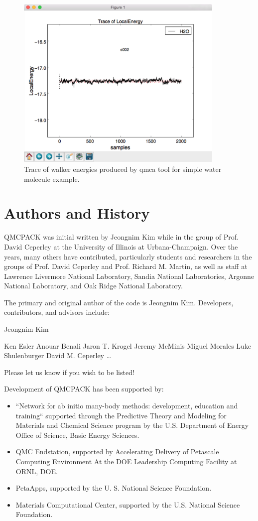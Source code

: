 \begin{figure}
  \centering
  \includegraphics[width=10cm]{figures/quick_qmca_dmc_trace.png}
  \caption{Trace of walker energies produced by qmca tool for simple
    water molecule example.}
  \label{fig:quick_qmca_dmc_trace}
\end{figure}

\section{Authors and History}
\label{sec:history}
QMCPACK was initial written by Jeongnim Kim while in the group of
Prof. David Ceperley at the University of Illinois at
Urbana-Champaign. Over the years, many others have contributed, particularly
students and researchers in the groups of Prof. David Ceperley
and Prof. Richard M. Martin, as well as staff at Lawrence Livermore
National Laboratory, Sandia National Laboratories, Argonne National
Laboratory, and Oak Ridge National Laboratory.

The primary and original author of the code is Jeongnim
Kim. Developers, contributors, and advisors include:

Jeongnim Kim

Ken Esler
Anouar Benali
Jaron T. Krogel
Jeremy McMinis
Miguel Morales
Luke Shulenburger
David M. Ceperley
\ldots

Please let us know if you wish to be listed!

Development of QMCPACK has been supported by:
\begin{itemize}
\item “Network for ab initio many-body methods: development, education
  and training“ supported through the Predictive
  Theory and Modeling for Materials and Chemical Science program by
  the U.S. Department of Energy Office of Science, Basic Energy
  Sciences.
\item QMC Endstation, supported by Accelerating Delivery of Petascale
  Computing Environment At the DOE Leadership Computing Facility at
  ORNL, DOE. 
\item PetaApps, supported by the U. S. National Science
  Foundation.
\item Materials Computational Center, supported by the
  U.S. National Science Foundation.
\end{itemize}



